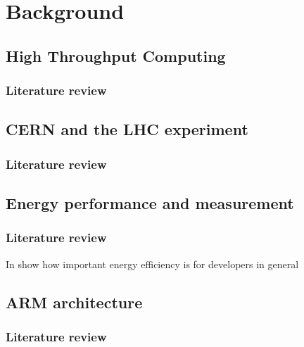 \chapter{Background}

\section{High Throughput Computing}
\subsection{Literature review}

\section{CERN and the LHC experiment}
\subsection{Literature review}

\section{Energy performance and measurement}
\subsection{Literature review}

In \cite{QUESTIONS_ENERGY}  show how important energy efficiency is for
developers in general

\section{ARM architecture}
\subsection{Literature review}



